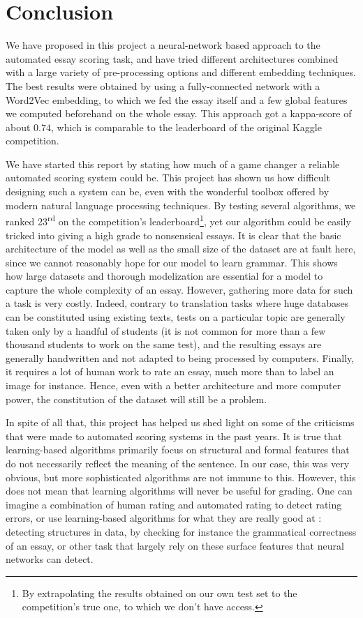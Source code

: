 \documentclass[a4paper,12pt,english]{article}
\begin{document}
\section{Conclusion}
We have proposed in this project a neural-network based approach to the automated essay scoring task, and have tried different architectures combined with a large variety of pre-processing options and different embedding techniques. The best results were obtained by using a fully-connected network with a Word2Vec embedding, to which we fed the essay itself and a few global features we computed beforehand on the whole essay. This approach got a kappa-score of about $0.74$, which is comparable to the leaderboard of the original Kaggle competition.\par
We have started this report by stating how much of a game changer a reliable automated scoring system could be. This project has shown us how difficult designing such a system can be, even with the wonderful toolbox offered by modern natural language processing techniques. By testing several algorithms, we ranked 23\textsuperscript{rd} on the competition's leaderboard\footnote{By extrapolating the results obtained on our own test set to the competition's true one, to which we don't have access.}, yet our algorithm could be easily tricked into giving a high grade to nonsensical essays. It is clear that the basic architecture of the model as well as the small size of the dataset are at fault here, since we cannot reasonably hope for our model to learn grammar. This shows how large datasets and thorough modelization are essential for a model to capture the whole complexity of an essay. However, gathering more data for such a task is very costly. Indeed, contrary to translation tasks where huge databases can be constituted using existing texts, tests on a particular topic are generally taken only by a handful of students (it is not common for more than a few thousand students to work on the same test), and the resulting essays are generally handwritten and not adapted to being processed by computers. Finally, it requires a lot of human work to rate an essay, much more than to label an image for instance. Hence, even with a better architecture and more computer power, the constitution of the dataset will still be a problem.\par
In spite of all that, this project has helped us shed light on some of the criticisms that were made to automated scoring systems in the past years. It is true that learning-based algorithms primarily focus on structural and formal features that do not necessarily reflect the meaning of the sentence. In our case, this was very obvious, but more sophisticated algorithms are not immune to this. However, this does not mean that learning algorithms will never be useful for grading. One can imagine a combination of human rating and automated rating to detect rating errors, or use learning-based algorithms for what they are really good at : detecting structures in data, by checking for instance the grammatical correctness of an essay, or other task that largely rely on these surface features that neural networks can detect.
\end{document}
